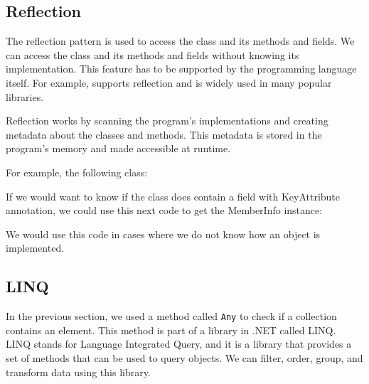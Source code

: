 \subsection{Reflection}

The reflection pattern is used to access the class and its methods and fields. We can access the class and its methods and fields without knowing its implementation.
This feature has to be supported by the programming language itself. For example, \CS supports reflection and is widely used in many popular libraries.

Reflection works by scanning the program's implementations and creating metadata about the classes and methods.
This metadata is stored in the program's memory and made accessible at runtime.

For example, the following class:


If we would want to know if the class does contain a field with KeyAttribute annotation, we could use this next code to get the MemberInfo instance:


We would use this code in cases where we do not know how an object is implemented.

\subsection {LINQ}

In the previous section, we used a method called \texttt{Any} to check if a collection contains an element. This method is part of a library in .NET called LINQ.
LINQ stands for Language Integrated Query, and it is a library that provides a set of methods that can be used to query objects.
We can filter, order, group, and transform data using this library.

